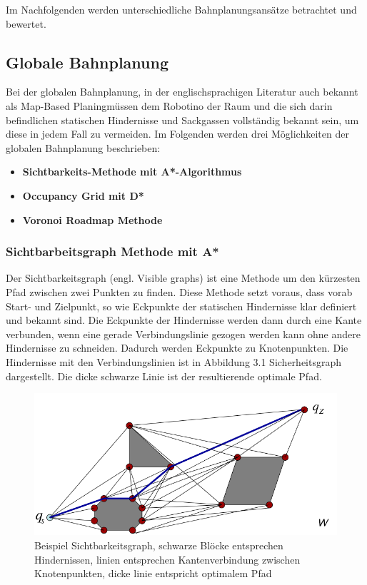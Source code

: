 Im Nachfolgenden werden unterschiedliche Bahnplanungsansätze betrachtet und bewertet.
\subsection{Globale Bahnplanung}
Bei der globalen Bahnplanung, in der englischsprachigen Literatur auch bekannt als \glqq Map-Based Planing\grqq müssen dem Robotino der Raum und die sich darin befindlichen statischen Hindernisse und Sackgassen vollständig bekannt sein, um diese in jedem Fall zu vermeiden. Im Folgenden werden drei Möglichkeiten der globalen Bahnplanung beschrieben: 
\begin{itemize}
\item \textbf{Sichtbarkeits-Methode mit A*-Algorithmus}
\item \textbf{Occupancy Grid mit D*}
\item \textbf{Voronoi Roadmap Methode}
\end{itemize}

\subsubsection{Sichtbarbeitsgraph Methode mit A*}
Der Sichtbarkeitsgraph (engl. Visible graphs) ist eine Methode um den kürzesten Pfad zwischen zwei Punkten zu finden. 
Diese Methode setzt voraus, dass vorab Start- und Zielpunkt, so wie Eckpunkte der statischen Hindernisse klar definiert und bekannt sind.  
Die Eckpunkte der Hindernisse werden dann durch eine Kante verbunden, wenn eine gerade Verbindungslinie gezogen werden kann ohne andere Hindernisse zu schneiden. Dadurch werden Eckpunkte zu Knotenpunkten. Die Hindernisse mit den Verbindungslinien ist in Abbildung 3.1 Sicherheitsgraph dargestellt. Die dicke schwarze Linie ist der resultierende optimale Pfad. 
\begin{figure}[h]
	\centering	
	\includegraphics{Sichtbarkeitsgraph.png}
	\caption{Beispiel Sichtbarkeitsgraph, schwarze Blöcke entsprechen Hindernissen, linien entsprechen Kantenverbindung zwischen Knotenpunkten, dicke linie entspricht optimalem Pfad}
	\label{fig:Sichtbarkeitssgraph}
\end{figure}

